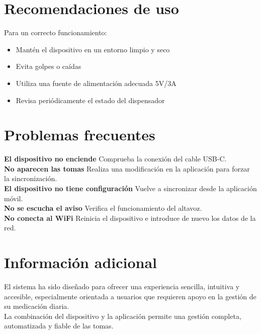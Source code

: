 \section{Recomendaciones de uso}

Para un correcto funcionamiento:

\begin{itemize}
\item Mantén el dispositivo en un entorno limpio y seco
\item Evita golpes o caídas
\item Utiliza una fuente de alimentación adecuada 5V/3A
\item Revisa periódicamente el estado del dispensador
\end{itemize}

\section{Problemas frecuentes}

\textbf{El dispositivo no enciende}
Comprueba la conexión del cable USB-C.\\

\textbf{No aparecen las tomas}
Realiza una modificación en la aplicación para forzar la sincronización.\\

\textbf{El dispositivo no tiene configuración}
Vuelve a sincronizar desde la aplicación móvil.\\

\textbf{No se escucha el aviso}
Verifica el funcionamiento del altavoz.\\

\textbf{No conecta al WiFi}
Reinicia el dispositivo e introduce de nuevo los datos de la red.\\

\section{Información adicional}

El sistema ha sido diseñado para ofrecer una experiencia sencilla, intuitiva y accesible, especialmente orientada a usuarios que requieren apoyo en la gestión de su medicación diaria.\\

La combinación del dispositivo y la aplicación permite una gestión completa, automatizada y fiable de las tomas.
